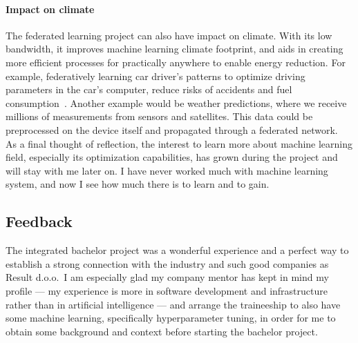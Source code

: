 
\paragraph{Impact on climate} The federated learning project can also have impact on climate. With its low bandwidth, it improves machine learning climate footprint, and aids in creating more efficient processes for practically anywhere to enable energy reduction. For example, federatively learning car driver's patterns to optimize driving parameters in the car's computer, reduce risks of accidents and fuel consumption~\cite{luCrossVehicleFederatedLearning2025}. Another example would be weather predictions, where we receive millions of measurements from sensors and satellites. This data could be preprocessed on the device itself and propagated through a federated network. \\

\noindent
As a final thought of reflection, the interest to learn more about machine learning field, especially its optimization capabilities, has grown during the project and will stay with me later on. I have never worked much with machine learning system, and now I see how much there is to learn and to gain.



\subsection{Feedback}


The integrated bachelor project was a wonderful experience and a perfect way to establish a strong connection with the industry and such good companies as Result d.o.o.\ I am especially glad my company mentor has kept in mind my profile --- my experience is more in software development and infrastructure rather than in artificial intelligence --- and arrange the traineeship to also have some machine learning, specifically hyperparameter tuning, in order for me to obtain some background and context before starting the bachelor project.


